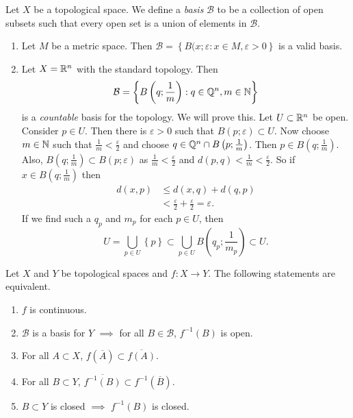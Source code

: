\begin{definition}[Basis]
	Let $X$ be a topological space.
	We define a \emph{basis} $\mathcal B$ to be a collection of open subsets
	such that every open set is a union of elements in $\mathcal B$.
\end{definition}

\begin{examples}[]
	\begin{enumerate}
		\item Let $M$ be a metric space.
			Then $\mathcal B = \left\{ B(x;\varepsilon: x \in M, \varepsilon > 0 \right\}$ is a valid basis.

		\item Let $X = \mathbb{R}^n$ with the standard topology.
			Then
			\[
				\mathcal B = \left\{ B\left( q; \frac1m \right): q \in \mathbb{Q}^n, m
				\in \mathbb{N} \right\}
			\]
			is a \emph{countable} basis for the topology.
			We will prove this.
			Let $U \subset \mathbb{R}^n$ be open.
			Consider $p \in U$.
			Then there is $\varepsilon > 0$ such that $B(p; \varepsilon) \subset
			U$.
			Now choose $m \in \mathbb{N}$ such that $\frac1m < \frac{\varepsilon}{2}$
			and choose $q \in \mathbb{Q}^n \cap B\left( p; \frac{1}{m} \right)$.
			Then $p \in B\left( q; \frac1m \right)$.
			Also, $B\left( q; \frac1m \right) \subset B(p; \varepsilon)$ as
			$\frac 1m < \frac{\varepsilon}{2}$ and $d(p,q) < \frac1m < 
			\frac{\varepsilon}{2}$.
			So if $x \in B\left( q; \frac1m \right)$ then
			\begin{align*}
				d(x,p)
				&\leq d(x,q) + d(q,p) \\
				&< \frac{\varepsilon}{2} + \frac{\varepsilon}{2} = \varepsilon.
			\end{align*}
			If we find such a $q_p$ and $m_p$ for each $p \in U$, then
			\[
				U =
				\bigcup_{p \in U} \left\{ p \right\} \subset
				\bigcup_{p \in U} B\left( q_p; \frac{1}{m_p}  \right) \subset U.
			\]
	\end{enumerate}
\end{examples}

\begin{theorem}[]
	\label{the:top-spaces-equiv}
	Let $X$ and $Y$ be topological spaces and $f: X \to Y$.
	The following statements are equivalent.
	\begin{enumerate}
		\item $f$ is continuous.
		\item $\mathcal B$ is a basis for $Y$ $\implies$ 
			for all $B \in \mathcal B$, $f^{-1}(B)$ is open.

		\item For all $A \subset X$, $f(\overline A) \subset \overline{f(A)}$.
		\item For all $B \subset Y$, 
			$\overline{f^{-1}(B)} \subset f^{-1}(\overline B)$.
		\item $B \subset Y$ is closed $\implies$ $f^{-1}(B)$ is closed.
	\end{enumerate}
\end{theorem}

